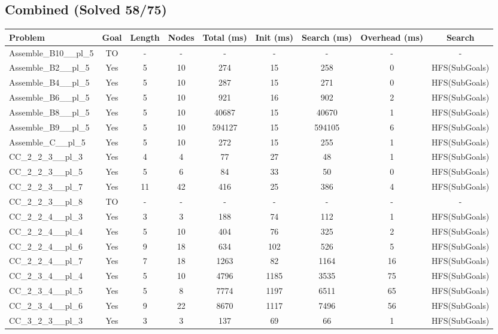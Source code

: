 \documentclass{article}
\begin{document}
\subsection*{Combined (Solved 58/75)}
\begin{tabular}{lcccccccc}
\toprule
Problem & Goal & Length & Nodes & Total (ms) & Init (ms) & Search (ms) & Overhead (ms) & Search \\
\midrule
Assemble\_B10\_\_pl\_5 & TO & - & - & - & - & - & - & - \\
Assemble\_B2\_\_pl\_5 & Yes & 5 & 10 & 274 & 15 & 258 & 0 & HFS(SubGoals) \\
Assemble\_B4\_\_pl\_5 & Yes & 5 & 10 & 287 & 15 & 271 & 0 & HFS(SubGoals) \\
Assemble\_B6\_\_pl\_5 & Yes & 5 & 10 & 921 & 16 & 902 & 2 & HFS(SubGoals) \\
Assemble\_B8\_\_pl\_5 & Yes & 5 & 10 & 40687 & 15 & 40670 & 1 & HFS(SubGoals) \\
Assemble\_B9\_\_pl\_5 & Yes & 5 & 10 & 594127 & 15 & 594105 & 6 & HFS(SubGoals) \\
Assemble\_C\_\_pl\_5 & Yes & 5 & 10 & 272 & 15 & 255 & 1 & HFS(SubGoals) \\
CC\_2\_2\_3\_\_pl\_3 & Yes & 4 & 4 & 77 & 27 & 48 & 1 & HFS(SubGoals) \\
CC\_2\_2\_3\_\_pl\_5 & Yes & 5 & 6 & 84 & 33 & 50 & 0 & HFS(SubGoals) \\
CC\_2\_2\_3\_\_pl\_7 & Yes & 11 & 42 & 416 & 25 & 386 & 4 & HFS(SubGoals) \\
CC\_2\_2\_3\_\_pl\_8 & TO & - & - & - & - & - & - & - \\
CC\_2\_2\_4\_\_pl\_3 & Yes & 3 & 3 & 188 & 74 & 112 & 1 & HFS(SubGoals) \\
CC\_2\_2\_4\_\_pl\_4 & Yes & 5 & 10 & 404 & 76 & 325 & 2 & HFS(SubGoals) \\
CC\_2\_2\_4\_\_pl\_6 & Yes & 9 & 18 & 634 & 102 & 526 & 5 & HFS(SubGoals) \\
CC\_2\_2\_4\_\_pl\_7 & Yes & 7 & 18 & 1263 & 82 & 1164 & 16 & HFS(SubGoals) \\
CC\_2\_3\_4\_\_pl\_4 & Yes & 5 & 10 & 4796 & 1185 & 3535 & 75 & HFS(SubGoals) \\
CC\_2\_3\_4\_\_pl\_5 & Yes & 5 & 8 & 7774 & 1197 & 6511 & 65 & HFS(SubGoals) \\
CC\_2\_3\_4\_\_pl\_6 & Yes & 9 & 22 & 8670 & 1117 & 7496 & 56 & HFS(SubGoals) \\
CC\_3\_2\_3\_\_pl\_3 & Yes & 3 & 3 & 137 & 69 & 66 & 1 & HFS(SubGoals) \\

\end{tabular}
\end{document}

